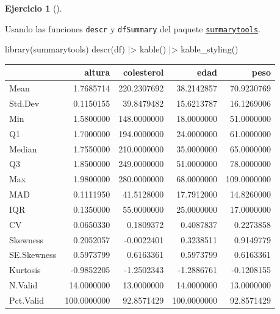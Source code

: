 \documentclass[
  a4paper,
]{scrreport}
\newenvironment{Shaded}{\begin{snugshade}}{\end{snugshade}}
\newcommand{\FunctionTok}[1]{\textcolor[rgb]{0.28,0.35,0.67}{#1}}
\newcommand{\NormalTok}[1]{\textcolor[rgb]{0.00,0.23,0.31}{#1}}
\newcommand{\SpecialCharTok}[1]{\textcolor[rgb]{0.37,0.37,0.37}{#1}}
\theoremstyle{definition}
\newtheorem{exercise}{Ejercicio}[chapter]
\theoremstyle{remark}
\begin{document}
\begin{exercise}[]
\begin{enumerate}
  \begin{tcolorbox}[enhanced jigsaw, toprule=.15mm, rightrule=.15mm, arc=.35mm, colback=white, colbacktitle=quarto-callout-tip-color!10!white, toptitle=1mm, left=2mm, colframe=quarto-callout-tip-color-frame, opacityback=0, breakable, opacitybacktitle=0.6, bottomtitle=1mm, titlerule=0mm, title=\textcolor{quarto-callout-tip-color}{\faLightbulb}\hspace{0.5em}{Solución 4}, bottomrule=.15mm, coltitle=black, leftrule=.75mm]

  Usando las funciones \texttt{descr} y \texttt{dfSummary} del paquete
  \href{https://cran.r-project.org/web/packages/summarytools/vignettes/introduction.html}{\texttt{summarytools}}.

\begin{Shaded}
\begin{Highlighting}[]
\FunctionTok{library}\NormalTok{(summarytools)}
\FunctionTok{descr}\NormalTok{(df) }\SpecialCharTok{|\textgreater{}}
\FunctionTok{kable}\NormalTok{() }\SpecialCharTok{|\textgreater{}}
\FunctionTok{kable\_styling}\NormalTok{()}
\end{Highlighting}
\end{Shaded}

  \begin{table}
  \centering
  \begin{tabular}{l|r|r|r|r}
  \hline
    & altura & colesterol & edad & peso\\
  \hline
  Mean & 1.7685714 & 220.2307692 & 38.2142857 & 70.9230769\\
  \hline
  Std.Dev & 0.1150155 & 39.8479482 & 15.6213787 & 16.1269006\\
  \hline
  Min & 1.5800000 & 148.0000000 & 18.0000000 & 51.0000000\\
  \hline
  Q1 & 1.7000000 & 194.0000000 & 24.0000000 & 61.0000000\\
  \hline
  Median & 1.7550000 & 210.0000000 & 35.0000000 & 65.0000000\\
  \hline
  Q3 & 1.8500000 & 249.0000000 & 51.0000000 & 78.0000000\\
  \hline
  Max & 1.9800000 & 280.0000000 & 68.0000000 & 109.0000000\\
  \hline
  MAD & 0.1111950 & 41.5128000 & 17.7912000 & 14.8260000\\
  \hline
  IQR & 0.1350000 & 55.0000000 & 25.0000000 & 17.0000000\\
  \hline
  CV & 0.0650330 & 0.1809372 & 0.4087837 & 0.2273858\\
  \hline
  Skewness & 0.2052057 & -0.0022401 & 0.3238511 & 0.9149779\\
  \hline
  SE.Skewness & 0.5973799 & 0.6163361 & 0.5973799 & 0.6163361\\
  \hline
  Kurtosis & -0.9852205 & -1.2502343 & -1.2886761 & -0.1208155\\
  \hline
  N.Valid & 14.0000000 & 13.0000000 & 14.0000000 & 13.0000000\\
  \hline
  Pct.Valid & 100.0000000 & 92.8571429 & 100.0000000 & 92.8571429\\
  \hline
  \end{tabular}
  \end{table}


\end{tcolorbox}
\end{enumerate}
\end{exercise}
\end{document}
